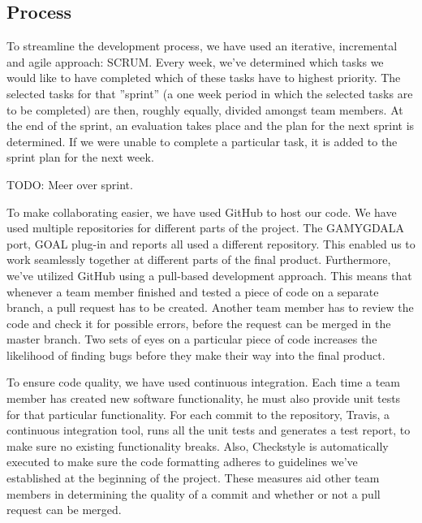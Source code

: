 \subsection{Process}
To streamline the development process, we have used an iterative, incremental and agile approach: SCRUM. Every week, we've determined which tasks we would like to have completed which of these tasks have to highest priority. The selected tasks for that ''sprint'' (a one week period in which the selected tasks are to be completed) are then, roughly equally, divided amongst team members. At the end of the sprint, an evaluation takes place and the plan for the next sprint is determined. If we were unable to complete a particular task, it is added to the sprint plan for the next week.

TODO: Meer over sprint.

To make collaborating easier, we have used GitHub to host our code. We have used multiple repositories for different parts of the project. The GAMYGDALA port, GOAL plug-in and reports all used a different repository. This enabled us to work seamlessly together at different parts of the final product. Furthermore, we've utilized GitHub using a pull-based development approach. This means that whenever a team member finished and tested a piece of code on a separate branch, a pull request has to be created. Another team member has to review the code and check it for possible errors, before the request can be merged in the master branch. Two sets of eyes on a particular piece of code increases the likelihood of finding bugs before they make their way into the final product. 

To ensure code quality, we have used continuous integration. Each time a team member has created new software functionality, he must also provide unit tests for that particular functionality. For each commit to the repository, Travis, a continuous integration tool, runs all the unit tests and generates a test report, to make sure no existing functionality breaks. Also, Checkstyle is automatically executed to make sure the code formatting adheres to guidelines we've established at the beginning of the project. These measures aid other team members in determining the quality of a commit and whether or not a pull request can be merged.